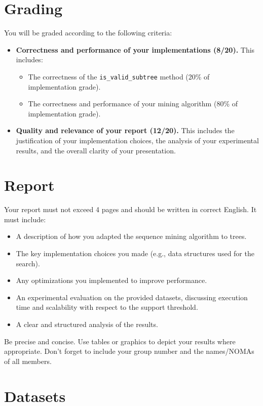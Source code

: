 \documentclass[]{article}
\begin{document}
\section{Grading}

You will be graded according to the following criteria:

\begin{itemize}
	\item \textbf{Correctness and performance of your implementations (8/20).} This includes:
	\begin{itemize}
	    \item The correctness of the \texttt{is\_valid\_subtree} method (20\% of implementation grade).
	    \item The correctness and performance of your mining algorithm (80\% of implementation grade).
	\end{itemize}
	\item \textbf{Quality and relevance of your report (12/20).} This includes the justification of your implementation choices, the analysis of your experimental results, and the overall clarity of your presentation.
\end{itemize}

\section{Report}
\label{report}

Your report must not exceed 4 pages and should be written in correct English. It must include:
\begin{itemize}
    \item A description of how you adapted the sequence mining algorithm to trees.
    \item The key implementation choices you made (e.g., data structures used for the search).
    \item Any optimizations you implemented to improve performance.
    \item An experimental evaluation on the provided datasets, discussing execution time and scalability with respect to the support threshold.
    \item A clear and structured analysis of the results.
\end{itemize}

Be precise and concise. Use tables or graphics to depict your results where appropriate. Don't forget to include your group number and the names/NOMAs of all members.

\section{Datasets}
\end{document}

